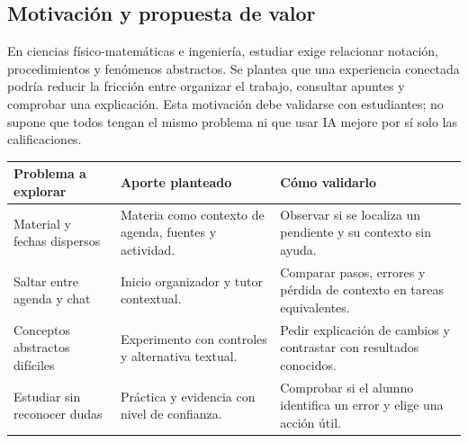 \subsection{Motivación y propuesta de valor}
En ciencias físico-matemáticas e ingeniería, estudiar exige relacionar notación, procedimientos y fenómenos abstractos. Se plantea que una experiencia conectada podría reducir la fricción entre organizar el trabajo, consultar apuntes y comprobar una explicación. Esta motivación debe validarse con estudiantes; no supone que todos tengan el mismo problema ni que usar IA mejore por sí solo las calificaciones.


\small
\begin{tabularx}{\linewidth}{P{3.2cm}Y Y}
\toprule
\textbf{Problema a explorar} & \textbf{Aporte planteado} & \textbf{Cómo validarlo}\\
\midrule
Material y fechas dispersos & Materia como contexto de agenda, fuentes y actividad. & Observar si se localiza un pendiente y su contexto sin ayuda.\\
Saltar entre agenda y chat & Inicio organizador y tutor contextual. & Comparar pasos, errores y pérdida de contexto en tareas equivalentes.\\
Conceptos abstractos difíciles & Experimento con controles y alternativa textual. & Pedir explicación de cambios y contrastar con resultados conocidos.\\
Estudiar sin reconocer dudas & Práctica y evidencia con nivel de confianza. & Comprobar si el alumno identifica un error y elige una acción útil.\\
\bottomrule
\end{tabularx}
\normalsize

